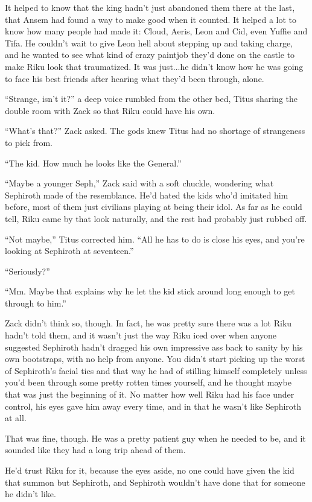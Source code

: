 It helped to know that the king hadn't just abandoned them there at the last, that Ansem had found a way to make good when it counted. It helped a lot to know how many people had made it: Cloud, Aeris, Leon and Cid, even Yuffie and Tifa. He couldn't wait to give Leon hell about stepping up and taking charge, and he wanted to see what kind of crazy paintjob they'd done on the castle to make Riku look that traumatized. It was just...he didn't know how he was going to face his best friends after hearing what they'd been through, alone.

``Strange, isn't it?'' a deep voice rumbled from the other bed, Titus sharing the double room with Zack so that Riku could have his own.

``What's that?'' Zack asked. The gods knew Titus had no shortage of strangeness to pick from.

``The kid. How much he looks like the General.''

``Maybe a younger Seph,'' Zack said with a soft chuckle, wondering what Sephiroth made of the resemblance. He'd hated the kids who'd imitated him before, most of them just civilians playing at being their idol. As far as he could tell, Riku came by that look naturally, and the rest had probably just rubbed off.

``Not maybe,'' Titus corrected him. ``All he has to do is close his eyes, and you're looking at Sephiroth at seventeen.''

``Seriously?''

``Mm. Maybe that explains why he let the kid stick around long enough to get through to him.''

Zack didn't think so, though. In fact, he was pretty sure there was a lot Riku hadn't told them, and it wasn't just the way Riku iced over when anyone suggested Sephiroth hadn't dragged his own impressive ass back to sanity by his own bootstraps, with no help from anyone. You didn't start picking up the worst of Sephiroth's facial tics and that way he had of stilling himself completely unless you'd been through some pretty rotten times yourself, and he thought maybe that was just the beginning of it. No matter how well Riku had his face under control, his eyes gave him away every time, and in that he wasn't like Sephiroth at all.

That was fine, though. He was a pretty patient guy when he needed to be, and it sounded like they had a long trip ahead of them.

He'd trust Riku for it, because the eyes aside, no one could have given the kid that summon but Sephiroth, and Sephiroth wouldn't have done that for someone he didn't like.


